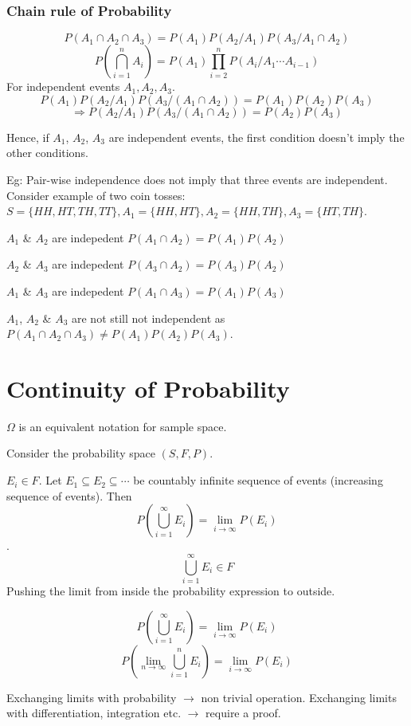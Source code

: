 \documentclass{article}
\begin{document}
\subsubsection{Chain rule of Probability}
$$ P(A_1 \cap A_2 \cap A_3)=P(A_1)P(A_2/A_1)P(A_3/A_1\cap A_2)$$
$$ P(\bigcap_{i=1}^n A_i)=P(A_1) \prod_{i=2}^n P(A_i/A_1\cdots A_{i-1})$$
For independent events $A_1, A_2, A_3$.
$$P(A_1)P(A_2/A_1)P(A_3/(A_1 \cap A_2))= P(A_1)P(A_2)P(A_3)$$
$$\Rightarrow P(A_2/A_1)P(A_3/(A_1 \cap A_2))= P(A_2)P(A_3)$$

Hence, if $A_1$, $A_2$, $A_3$ are independent events, the first condition doesn't imply the other conditions.

Eg: Pair-wise independence does not imply that three events are independent.
Consider example of two coin tosses:
$S= \{HH,HT,TH,TT\}, A_1=\{HH,HT\},A_2=\{HH,TH\},A_3=\{HT,TH\}$.

$A_1$ \& $A_2$ are indepedent $P(A_1 \cap A_2)=P(A_1)P(A_2)$

$A_2$ \& $A_3$ are indepedent $P(A_3 \cap A_2)=P(A_3)P(A_2)$

$A_1$ \& $A_3$ are indepedent $P(A_1 \cap A_3)=P(A_1)P(A_3)$

$A_1$, $A_2$  \& $A_3$ are not still not independent as $P(A_1 \cap A_2 \cap A_3) \neq P(A_1)P(A_2)P(A_3)$.

\section{Continuity of Probability}
$\Omega$ is an equivalent notation for sample space.

Consider the probability space $(S,F,P)$.

$E_i \in F$. Let $E_1 \subseteq E_2 \subseteq \cdots$ be countably infinite sequence of events (increasing sequence of events).
Then $$P(\bigcup_{i=1}^{\infty} E_i)= \lim_{i \to \infty} P(E_i)$$.
$$ \bigcup_{i=1}^{\infty} E_i \in F$$
Pushing the limit from inside the probability expression to outside.

$$P(\bigcup_{i=1}^{\infty} E_i)=\lim_{i \to \infty }P(E_i)$$
$$P(\lim_{n \to \infty} \bigcup_{i=1}^{n}E_i)=\lim_{i \to \infty }P(E_i)$$

Exchanging limits with probability $\rightarrow$ non trivial operation.
Exchanging limits with differentiation, integration etc. $\rightarrow$ require a proof.
\end{document}
